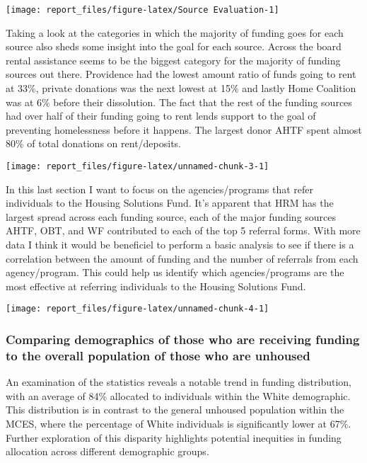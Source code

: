 \documentclass[
]{article}
\begin{document}
\texttt{[image: report\_files/figure-latex/Source Evaluation-1]}

Taking a look at the categories in which the majority of funding goes
for each source also sheds some insight into the goal for each source.
Across the board rental assistance seems to be the biggest category for
the majority of funding sources out there. Providence had the lowest
amount ratio of funds going to rent at 33\%, private donations was the
next lowest at 15\% and lastly Home Coalition was at 6\% before their
dissolution. The fact that the rest of the funding sources had over half
of their funding going to rent lends support to the goal of preventing
homelessness before it happens. The largest donor AHTF spent almost 80\%
of total donations on rent/deposits.

\texttt{[image: report\_files/figure-latex/unnamed-chunk-3-1]}

In this last section I want to focus on the agencies/programs that refer
individuals to the Housing Solutions Fund. It's apparent that HRM has
the largest spread across each funding source, each of the major funding
sources AHTF, OBT, and WF contributed to each of the top 5 referral
forms. With more data I think it would be beneficiel to perform a basic
analysis to see if there is a correlation between the amount of funding
and the number of referrals from each agency/program. This could help us
identify which agencies/programs are the most effective at referring
individuals to the Housing Solutions Fund.

\texttt{[image: report\_files/figure-latex/unnamed-chunk-4-1]}

\subsubsection{Comparing demographics of those who are receiving funding
to the overall population of those who are
unhoused}\label{comparing-demographics-of-those-who-are-receiving-funding-to-the-overall-population-of-those-who-are-unhoused}

An examination of the statistics reveals a notable trend in funding
distribution, with an average of 84\% allocated to individuals within
the White demographic. This distribution is in contrast to the general
unhoused population within the MCES, where the percentage of White
individuals is significantly lower at 67\%. Further exploration of this
disparity highlights potential inequities in funding allocation across
different demographic groups.
\end{document}
